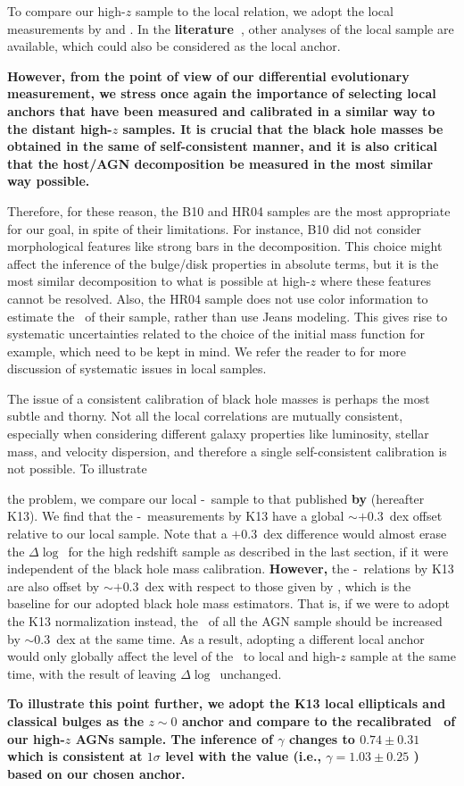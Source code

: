 \documentclass[apj]{emulateapj}
\begin{document}
To compare our high-$z$ sample to the local relation, we adopt the local measurements by \citet{Ben++10, Bennert++2011} and \citet{H+R04}. In the {\bf literature~\citep{Kormendy13, Bentz2018}}, other analyses of the local sample are available, which could also be considered as the local anchor.  {\bf However, from the point of view of our differential evolutionary measurement, we stress once again the importance of selecting local anchors that have been measured and calibrated in a similar way to the distant high-$z$ samples. It is crucial that the black hole masses be obtained in the same of self-consistent manner, and it is also critical that the host/AGN decomposition be measured in the most similar way possible.

Therefore, for these reason, the B10 and HR04 samples are the most appropriate for our goal, in spite of their limitations. For instance, B10 did not consider morphological features like strong bars in the decomposition. This choice might affect the inference of the bulge/disk properties in absolute terms, but it is the most similar decomposition to what is possible at high-$z$ where these features cannot be resolved. Also, the HR04 sample does not use color information to estimate the \smass~of their sample, rather than use Jeans modeling. This gives rise to systematic uncertainties related to the choice of the initial mass function for example, which need to be kept in mind. We refer the reader to \citet{Kormendy13} for more discussion of systematic issues in local samples.

The issue of a consistent calibration of black hole masses is perhaps the most subtle and thorny.
Not all the local correlations are mutually consistent, especially when considering different galaxy properties like luminosity, stellar mass, and velocity dispersion, and therefore a single self-consistent calibration is not possible. To illustrate} the problem, we compare our local \mbh-\smass\ sample to that published {\bf by} \citet{Kormendy13} (hereafter K13). We find that the \mbh-\smass\ measurements by K13 have a global $\sim+0.3$~dex offset relative to our local sample. Note that a $+0.3$~dex difference would almost erase the $\Delta\log$\mbh\ for the high redshift sample as described in the last section, if it were independent of the black hole mass calibration. {\bf However,} the \mbh-\sigstar\ relations by K13 are also offset by  $\sim+0.3$~dex with respect to those given by \citet{Woo2010}, which is the baseline for our adopted black hole mass estimators. That is, if we were to adopt the K13 normalization instead, the \mbh\ of all the AGN sample should be increased by $\sim$0.3~dex at the same time. As a result, adopting a different local anchor would only globally affect the level of the \mbh\ to local and high-$z$ sample at the same time, with the result of leaving $\Delta\log$\mbh\ unchanged. {\bf To illustrate this point further, we adopt the K13 local ellipticals and classical bulges as the $z\sim0$ anchor and compare to the recalibrated \mbh\ of our high-$z$ AGNs sample. The inference of  $\gamma$ changes to $0.74\pm0.31$ which is consistent at $1\sigma$ level with the value (i.e., $\gamma=1.03\pm0.25$ ) based on our chosen anchor.

}
\end{document}
